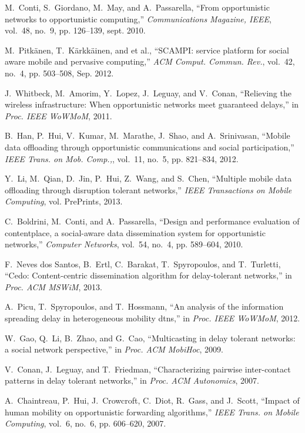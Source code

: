 \documentclass[journal]{IEEEtran}
\begin{document}
\begin{thebibliography}{10}
M.~Conti, S.~Giordano, M.~May, and A.~Passarella, ``From opportunistic networks
  to opportunistic computing,'' \emph{Communications Magazine, IEEE}, vol.~48,
  no.~9, pp. 126--139, sept. 2010.

M.~Pitk{\"a}nen, T.~K{\"a}rkk{\"a}inen, and {et al.}, ``{S}{C}{A}{M}{P}{I}:
  service platform for social aware mobile and pervasive computing,'' \emph{ACM
  Comput. Commun. Rev.}, vol.~42, no.~4, pp. 503--508, Sep. 2012.

J.~Whitbeck, M.~Amorim, Y.~Lopez, J.~Leguay, and V.~Conan, ``Relieving the
  wireless infrastructure: When opportunistic networks meet guaranteed
  delays,'' in \emph{Proc. IEEE WoWMoM}, 2011.

B.~Han, P.~Hui, V.~Kumar, M.~Marathe, J.~Shao, and A.~Srinivasan, ``Mobile data
  offloading through opportunistic communications and social participation,''
  \emph{IEEE Trans. on Mob. Comp.,}, vol.~11, no.~5, pp. 821--834, 2012.

Y.~Li, M.~Qian, D.~Jin, P.~Hui, Z.~Wang, and S.~Chen, ``Multiple mobile data
  offloading through disruption tolerant networks,'' \emph{IEEE Transactions on
  Mobile Computing}, vol. PrePrints, 2013.

C.~Boldrini, M.~Conti, and A.~Passarella, ``Design and performance evaluation
  of contentplace, a social-aware data dissemination system for opportunistic
  networks,'' \emph{Computer Networks}, vol.~54, no.~4, pp. 589--604, 2010.

F.~{Neves dos Santos}, B.~Ertl, C.~Barakat, T.~Spyropoulos, and T.~Turletti,
  ``Cedo: Content-centric dissemination algorithm for delay-tolerant
  networks,'' in \emph{Proc. ACM MSWiM}, 2013.

A.~Picu, T.~Spyropoulos, and T.~Hossmann, ``An analysis of the information
  spreading delay in heterogeneous mobility dtns,'' in \emph{Proc. IEEE
  WoWMoM}, 2012.

W.~Gao, Q.~Li, B.~Zhao, and G.~Cao, ``Multicasting in delay tolerant networks:
  a social network perspective,'' in \emph{Proc. ACM MobiHoc}, 2009.

V.~Conan, J.~Leguay, and T.~Friedman, ``Characterizing pairwise inter-contact
  patterns in delay tolerant networks,'' in \emph{Proc. ACM Autonomics}, 2007.

A.~Chaintreau, P.~Hui, J.~Crowcroft, C.~Diot, R.~Gass, and J.~Scott, ``Impact
  of human mobility on opportunistic forwarding algorithms,'' \emph{IEEE Trans.
  on Mobile Computing}, vol.~6, no.~6, pp. 606--620, 2007.


\end{thebibliography}
\end{document}
